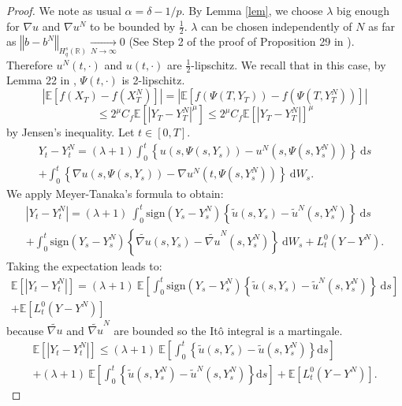 \documentclass[12pt]{article}
\newcommand{\norme}[1]{\left\Vert #1\right\Vert}
\newcommand{\R}{\mathbb{R}}
\newcommand{\E}{\mathbb{E}}
\newcommand{\di}{\mathrm{d}}
\begin{document}
\begin{proof}
    We note as usual $\alpha = \delta - 1/p$.
    By Lemma \ref{lem}, we choose $\lambda$ big enough for $\nabla u$ and $\nabla u^N$ to be bounded by $\frac{1}{2}$. $\lambda$ can be chosen independently of $N$ as far as $\norme{b - b^N}_{H_q^s(\R)} \underset{N\rightarrow\infty}{\longrightarrow} 0$ (See Step 2 of the proof of Proposition 29 in \cite{Fla-Iss-Rus-2017}). Therefore $u^N(t,\cdot)$ and $u(t,\cdot)$ are $\frac{1}{2}$-lipschitz. We recall that in this case, by Lemma 22 in \cite{Fla-Iss-Rus-2017}, $\Psi(t,\cdot)$ is 2-lipschitz.    
    \begin{equation*}
    \left|\E\left[f\left(X_T\right)-f\left(X_T^N\right)\right]\right| = \left|\E\left[f\left(\Psi\left(T,Y_T\right)\right)-f\left(\Psi\left(T,Y_T^N\right)\right)\right]\right|
    \end{equation*}    
    \begin{equation}\label{jensen}
    \leq 2^\mu C_f  \E\left[\left|Y_T-Y_T^N\right|^\mu\right] \leq 2^\mu C_f  \E\left[\left|Y_T-Y_T^N\right|\right]^\mu
    \end{equation}    
    by Jensen's inequality. Let $t\in[0,T]$. 
    \begin{multline*}
    Y_t-Y_t^N = (\lambda + 1 )\int_0^t\left\{u\left(s,\Psi\left(s,Y_s\right)\right)-u^N\left(s,\Psi\left(s,Y_s^N\right)\right)\right\}\ \di s\\ + \int_0^t\left\{\nabla u\left(s,\Psi\left(s,Y_s\right)\right)-\nabla u^N\left(t,\Psi\left(s,Y_s^N\right)\right)\right\}\ \di W_s.
    \end{multline*}
    We apply Meyer-Tanaka's formula to obtain:
    \begin{multline*}
    \left|Y_t-Y_t^N\right| = (\lambda + 1)\ \int_0^t\mathrm{sign}(Y_s-Y_s^N)\left\{\tilde{u}\left(s,Y_s\right)-\tilde{u}^N\left(s,Y_s^N\right)\right\}\ \di s\\ + \int_0^t\mathrm{sign}(Y_s-Y_s^N)\left\{\widetilde{\nabla u}\left(s,Y_s\right)-\widetilde{\nabla u}^N\left(s,Y_s^N\right)\right\}\ \di W_s + L_t^0(Y-Y^N).
     \end{multline*}    
    Taking the expectation leads to:
    \begin{multline*}
    \E\left[\left|Y_t-Y_t^N\right|\right] = (\lambda + 1)\ \E\left[\int_0^t\mathrm{sign}(Y_s-Y_s^N)\left\{\tilde{u}\left(s,Y_s\right)-\tilde{u}^N\left(s,Y_s^N\right)\right\}\ \di s\right]\\ + \E \left[L_t^0(Y-Y^N)\right]
    \end{multline*}
    because $\widetilde{\nabla u}$ and $\widetilde{\nabla u}^N$ are bounded so the Itô integral is a martingale.    
    \begin{multline*}
    \E\left[\left|Y_t-Y_t^N\right|\right]\leq (\lambda + 1)\ \E\left[\int_0^t\left\{\tilde{u}\left(s,Y_s\right)-\tilde{u}\left(s,Y_s^N\right)\right\} \di s\right]\\ +(\lambda + 1)\ \E\left[\int_0^t\left\{\tilde{u}\left(s,Y_s^N\right)-\tilde{u}^N\left(s,Y_s^N\right)\right\} \di s\right] + \E \left[L_t^0(Y-Y^N)\right].
    \end{multline*}    

\end{proof}
\end{document}
